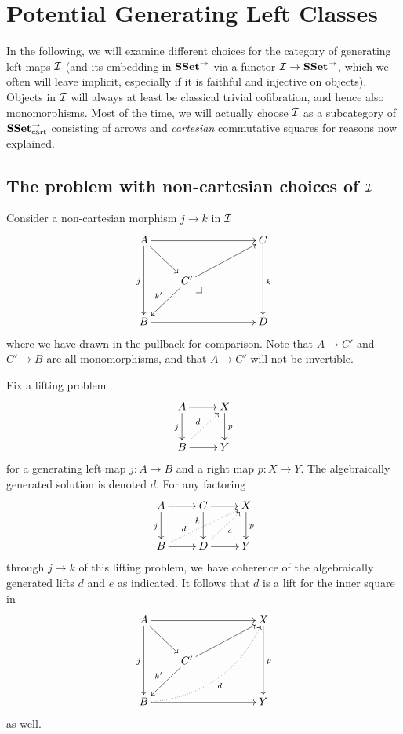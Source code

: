 \documentclass[reqno,10pt,a4paper,oneside]{amsart}
\begin{document}
\section*{Potential Generating Left Classes}

In the following, we will examine different choices for the category of generating left maps $\cal{I}$ (and its embedding in $\SSet^{\to}$ via a functor $\cal{I} \to \SSet^{\to}$, which we often will leave implicit, especially if it is faithful and injective on objects).
Objects in $\cal{I}$ will always at least be classical trivial cofibration, and hence also monomorphisms.
Most of the time, we will actually choose $\cal{I}$ as a subcategory of $\SSet_{\text{cart}}^{\to}$ consisting of arrows and \emph{cartesian} commutative squares for reasons now explained.

\subsection*{The problem with non-cartesian choices of $\cal{I}$}

Consider a non-cartesian morphism $j \to k$ in $\cal{I}$
\[
\xymatrix{
  A
  \ar[rrr]
  \ar[dd]_{j}
  \ar[dr]
&&&
  C
  \ar[dd]^{k}
\\&
  C'
  \ar[urr]
  \ar[dl]_{k'}
  \pullback{dr}
\\
  B
  \ar[rrr]
&&&
  D
}
\]
where we have drawn in the pullback for comparison.
Note that $A \to C'$ and $C' \to B$ are all monomorphisms, and that $A \to C'$ will not be invertible.

Fix a lifting problem
\[
\xymatrix{
  A
  \ar[r]
  \ar[d]_{j}
&
  X
  \ar[d]^{p}
\\
  B
  \ar[r]
  \ar@{.>}[ur]^{d}
&
  Y
}
\]
for a generating left map $j : A \to B$ and a right map $p : X \to Y$.
The algebraically generated solution is denoted $d$.
For any factoring
\[
\xymatrix{
  A
  \ar[r]
  \ar[d]_{j}
&
  C
  \ar[r]
  \ar[d]_(0.35){k}
&
  X
  \ar[d]^{p}
\\
  B
  \ar[r]
  \ar@{.>}[urr]^(0.3){d}
&
  D
  \ar[r]
  \ar@{.>}[ur]_{e}
&
  Y
}
\]
through $j \to k$ of this lifting problem, we have coherence of the algebraically generated lifts $d$ and $e$ as indicated.
It follows that $d$ is a lift for the inner square in
\[
\xymatrix{
  A
  \ar[rrr]
  \ar[dd]_{j}
  \ar[dr]
&&&
  X
  \ar[dd]^{p}
\\&
  C'
  \ar[urr]
  \ar[dl]_{k'}
\\
  B
  \ar[rrr]
  \ar@{.>}@/_2em/[uurrr]_{d}
&&&
  Y
}
\]
as well.
\end{document}
